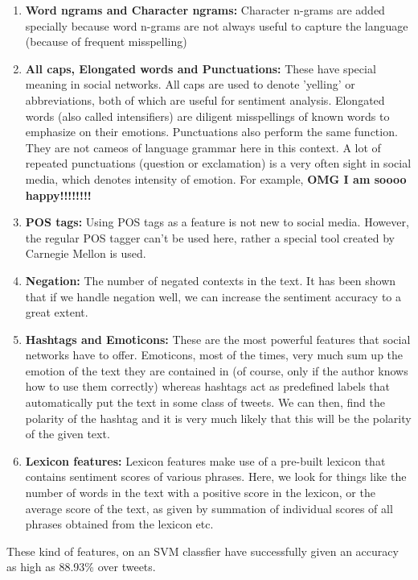 \begin{enumerate}
\setlength{\itemsep}{15pt}
 \item \textbf{Word ngrams and Character ngrams:} Character n-grams are added specially because word n-grams are not always useful to capture the language (because of frequent misspelling)
 \item \textbf{All caps, Elongated words and Punctuations:} These have special meaning in social networks. All caps are used to denote 'yelling' or abbreviations, both of which are useful
 for sentiment analysis. Elongated words (also called intensifiers) are diligent misspellings of known words to emphasize on their emotions. Punctuations also
 perform the same function. They are not cameos of language grammar here in this context. A lot of repeated punctuations (question or exclamation) is a very often sight 
 in social media, which denotes intensity of emotion.
 For example, \textbf{OMG I am soooo happy!!!!!!!!}
\item \textbf{POS tags:} Using POS tags as a feature is not new to social media. However, the regular POS tagger can't be used here, rather a special tool created by Carnegie Mellon
is used.
\item \textbf{Negation:} The number of negated contexts in the text. It has been shown that if we handle negation well, we can increase the sentiment accuracy to a great extent.
\item \textbf{Hashtags and Emoticons:} These are the most powerful features that social networks have to offer. Emoticons, most of the times, very much sum up the emotion of
the text they are contained in (of course, only if the author knows how to use them correctly) whereas hashtags act as predefined labels that automatically put the text in some
class of tweets. We can then, find the polarity of the hashtag and it is very much likely that this will be the polarity of the given text.
\item \textbf{Lexicon features:} Lexicon features make use of a pre-built lexicon that contains sentiment scores of various phrases. Here, we look for things like the number
of words in the text with a positive score in the lexicon, or the average score of the text, as given by summation of individual scores of all phrases obtained from the lexicon etc.

\end{enumerate}

These kind of features, on an SVM classfier have successfully given an accuracy as high as 88.93\% over tweets.
